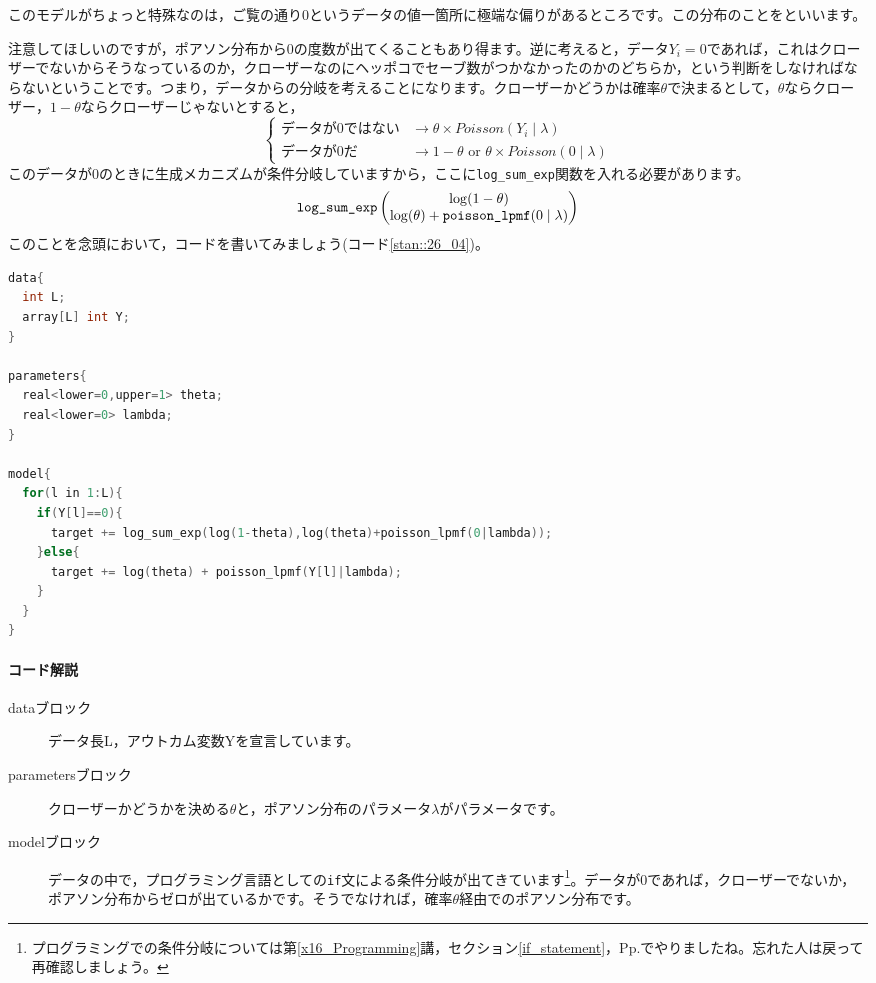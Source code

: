 \documentclass{ltjsbook}
\begin{document}
このモデルがちょっと特殊なのは，ご覧の通り0というデータの値一箇所に極端な偏りがあるところです。この分布のことをといいます。

注意してほしいのですが，ポアソン分布から0の度数が出てくることもあり得ます。逆に考えると，データ$Y_i=0$であれば，これはクローザーでないからそうなっているのか，クローザーなのにヘッポコでセーブ数がつかなかったのかのどちらか，という判断をしなければならないということです。つまり，データからの分岐を考えることになります。クローザーかどうかは確率$\theta$で決まるとして，$\theta$ならクローザー，$1-\theta$ならクローザーじゃないとすると，
\begin{equation}
	\left\{ \begin{array}{cc} \mbox{データが0ではない} & \to \theta \times Poisson(Y_i\mid\lambda)                    \\
             \mbox{データが0だ}         & \to 1-\theta \mbox{ or } \theta \times Poisson(0\mid\lambda)\end{array} \right.
\end{equation}
このデータが0のときに生成メカニズムが条件分岐していますから，ここに\verb|log_sum_exp|関数を入れる必要があります。
\begin{equation*}
	\verb|log_sum_exp| \begin{pmatrix} \log(1-\theta) \\ \log(\theta) + \verb|poisson_lpmf|(0\mid\lambda)\end{pmatrix}
\end{equation*}
このことを念頭において，コードを書いてみましょう(コード\ref{stan::26_04})。
\begin{lstlisting}[language=C++,label={stan::26_04},caption={ゼロ過剰ポアソン分布}]
data{
  int L;
  array[L] int Y;
}

parameters{
  real<lower=0,upper=1> theta;
  real<lower=0> lambda;
}

model{
  for(l in 1:L){
    if(Y[l]==0){
      target += log_sum_exp(log(1-theta),log(theta)+poisson_lpmf(0|lambda));
    }else{
      target += log(theta) + poisson_lpmf(Y[l]|lambda);
    }
  }
}
\end{lstlisting}
\paragraph{コード解説}
\begin{description}
	\item[dataブロック] データ長L，アウトカム変数Yを宣言しています。
	\item[parametersブロック] クローザーかどうかを決める$\theta$と，ポアソン分布のパラメータ$\lambda$がパラメータです。
	\item[modelブロック] データの中で，プログラミング言語としての\verb|if|文による条件分岐が出てきています\footnote{プログラミングでの条件分岐については第\ref{x16_Programming}講，セクション\ref{if_statement}，Pp.\pageref{if_statement}でやりましたね。忘れた人は戻って再確認しましょう。}。データが0であれば，クローザーでないか，ポアソン分布からゼロが出ているかです。そうでなければ，確率$\theta$経由でのポアソン分布です。
\end{description}
\end{document}
